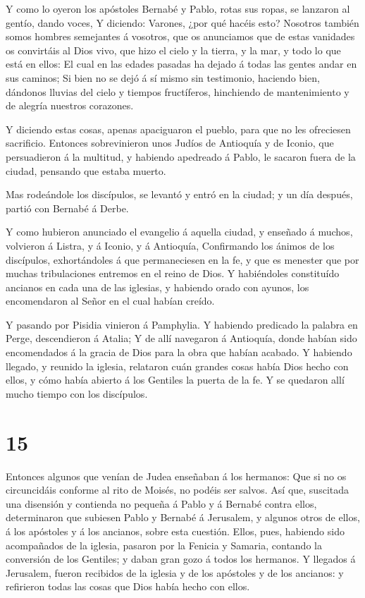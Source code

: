  Y como lo oyeron los apóstoles Bernabé y Pablo, rotas sus
ropas, se lanzaron al gentío, dando voces,  Y diciendo:
Varones, ¿por qué hacéis esto? Nosotros también somos hombres semejantes
á vosotros, que os anunciamos que de estas vanidades os convirtáis al
Dios vivo, que hizo el cielo y la tierra, y la mar, y todo lo que está
en ellos:  El cual en las edades pasadas ha dejado á todas
las gentes andar en sus caminos;  Si bien no se dejó á sí
mismo sin testimonio, haciendo bien, dándonos lluvias del cielo y
tiempos fructíferos, hinchiendo de mantenimiento y de alegría nuestros
corazones.

 Y diciendo estas cosas, apenas apaciguaron el pueblo, para
que no les ofreciesen sacrificio.  Entonces sobrevinieron
unos Judíos de Antioquía y de Iconio, que persuadieron á la multitud, y
habiendo apedreado á Pablo, le sacaron fuera de la ciudad, pensando que
estaba muerto.

 Mas rodeándole los discípulos, se levantó y entró en la
ciudad; y un día después, partió con Bernabé á Derbe.

 Y como hubieron anunciado el evangelio á aquella ciudad, y
enseñado á muchos, volvieron á Listra, y á Iconio, y á Antioquía,
 Confirmando los ánimos de los discípulos, exhortándoles á
que permaneciesen en la fe, y que es menester que por muchas
tribulaciones entremos en el reino de Dios.  Y habiéndoles
constituído ancianos en cada una de las iglesias, y habiendo orado con
ayunos, los encomendaron al Señor en el cual habían creído.

 Y pasando por Pisidia vinieron á Pamphylia. 
Y habiendo predicado la palabra en Perge, descendieron á Atalia;
 Y de allí navegaron á Antioquía, donde habían sido
encomendados á la gracia de Dios para la obra que habían acabado.
 Y habiendo llegado, y reunido la iglesia, relataron cuán
grandes cosas había Dios hecho con ellos, y cómo había abierto á los
Gentiles la puerta de la fe.  Y se quedaron allí mucho
tiempo con los discípulos.

\hypertarget{section-14}{%
\section{15}\label{section-14}}

 Entonces algunos que venían de Judea enseñaban á los
hermanos: Que si no os circuncidáis conforme al rito de Moisés, no
podéis ser salvos.  Así que, suscitada una disensión y
contienda no pequeña á Pablo y á Bernabé contra ellos, determinaron que
subiesen Pablo y Bernabé á Jerusalem, y algunos otros de ellos, á los
apóstoles y á los ancianos, sobre esta cuestión.  Ellos,
pues, habiendo sido acompañados de la iglesia, pasaron por la Fenicia y
Samaria, contando la conversión de los Gentiles; y daban gran gozo á
todos los hermanos.  Y llegados á Jerusalem, fueron
recibidos de la iglesia y de los apóstoles y de los ancianos: y
refirieron todas las cosas que Dios había hecho con ellos.

